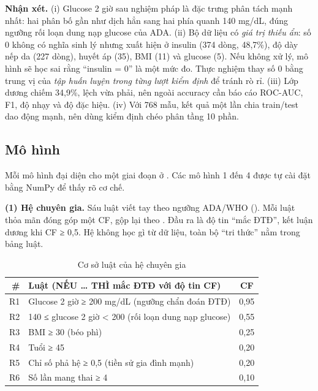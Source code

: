
\textbf{Nhận xét.} (i) Glucose 2 giờ sau nghiệm pháp là đặc trưng phân tách mạnh nhất: hai phân bố gần như dịch hẳn sang hai phía quanh 140 mg/dL, đúng ngưỡng rối loạn dung nạp glucose của ADA. (ii) Bộ dữ liệu có \emph{giá trị thiếu ẩn}: số 0 không có nghĩa sinh lý nhưng xuất hiện ở insulin (374 dòng, 48,7\%), độ dày nếp da (227 dòng), huyết áp (35), BMI (11) và glucose (5). Nếu không xử lý, mô hình sẽ học sai rằng ``insulin = 0'' là một mức đo. Thực nghiệm thay số 0 bằng trung vị của \emph{tập huấn luyện trong từng lượt kiểm định} để tránh rò rỉ. (iii) Lớp dương chiếm 34,9\%, lệch vừa phải, nên ngoài accuracy cần báo cáo ROC-AUC, F1, độ nhạy và độ đặc hiệu. (iv) Với 768 mẫu, kết quả một lần chia train/test dao động mạnh, nên dùng kiểm định chéo phân tầng 10 phần.

\subsection{Mô hình}

Mỗi mô hình đại diện cho một giai đoạn ở . Các mô hình 1 đến 4 được tự cài đặt bằng NumPy để thấy rõ cơ chế.

\textbf{(1) Hệ chuyên gia.} Sáu luật viết tay theo ngưỡng ADA/WHO (). Mỗi luật thỏa mãn đóng góp một CF, gộp lại theo . Đầu ra là độ tin ``mắc ĐTĐ'', kết luận dương khi CF ≥ 0,5. Hệ không học gì từ dữ liệu, toàn bộ ``tri thức'' nằm trong bảng luật.

\begin{table}[H]
\centering
\caption{Cơ sở luật của hệ chuyên gia}
\label{tab:pima-rules}
\small
\begin{tabularx}{\linewidth}{@{}rYc@{}}
\toprule
\textbf{\#} & \textbf{Luật (NẾU … THÌ mắc ĐTĐ với độ tin CF)} & \textbf{CF} \\
\midrule
R1 & Glucose 2 giờ ≥ 200 mg/dL (ngưỡng chẩn đoán ĐTĐ) & 0,95 \\
R2 & 140 ≤ glucose 2 giờ < 200 (rối loạn dung nạp glucose) & 0,55 \\
R3 & BMI ≥ 30 (béo phì) & 0,25 \\
R4 & Tuổi ≥ 45 & 0,20 \\
R5 & Chỉ số phả hệ ≥ 0,5 (tiền sử gia đình mạnh) & 0,20 \\
R6 & Số lần mang thai ≥ 4 & 0,10 \\
\bottomrule
\end{tabularx}
\end{table}

